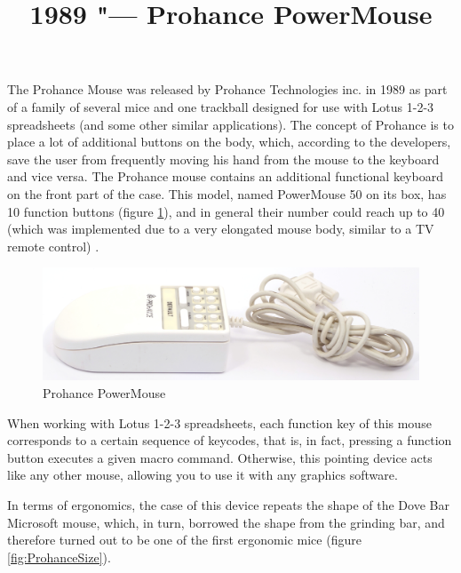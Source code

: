 \documentclass[11pt, a4paper]{article}
\begin{document}
\title{1989 "--- Prohance PowerMouse}
\date{}
\maketitle

The Prohance Mouse was released by Prohance Technologies inc. in 1989 as part of a family of several mice and one trackball designed for use with Lotus 1-2-3 spreadsheets (and some other similar applications). The concept of Prohance is to place a lot of additional buttons on the body, which, according to the developers, save the user from frequently moving his hand from the mouse to the keyboard and vice versa. The Prohance mouse contains an additional functional keyboard on the front part of the case. This model, named PowerMouse 50 on its box, has 10 function buttons (figure \ref{fig:ProhancePhoto}), and in general their number could reach up to 40 (which was implemented due to a very elongated mouse body, similar to a TV remote control) \cite{livingston}.

\begin{figure}[h]
    \centering
    \includegraphics[scale=0.55]{1989_prohance_powermouse/pic_30.jpg}
    \caption{Prohance PowerMouse}
    \label{fig:ProhancePhoto}
\end{figure}

When working with Lotus 1-2-3 spreadsheets, each function key of this mouse corresponds to a certain sequence of keycodes, that is, in fact, pressing a function button executes a given macro command. Otherwise, this pointing device acts like any other mouse, allowing you to use it with any graphics software.

In terms of ergonomics, the case of this device repeats the shape of the Dove Bar Microsoft mouse, which, in turn, borrowed the shape from the grinding bar, and therefore turned out to be one of the first ergonomic mice (figure \ref{fig:ProhanceSize}).
\end{document}
